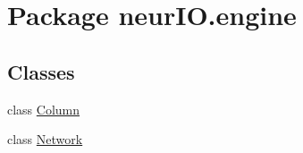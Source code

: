 \hypertarget{namespaceneur_i_o_1_1engine}{}\section{Package neur\+I\+O.\+engine}
\label{namespaceneur_i_o_1_1engine}
\subsection*{Classes}
\begin{DoxyCompactItemize}
\item 
class \hyperlink{classneur_i_o_1_1engine_1_1_column}{Column}
\item 
class \hyperlink{classneur_i_o_1_1engine_1_1_network}{Network}
\end{DoxyCompactItemize}
